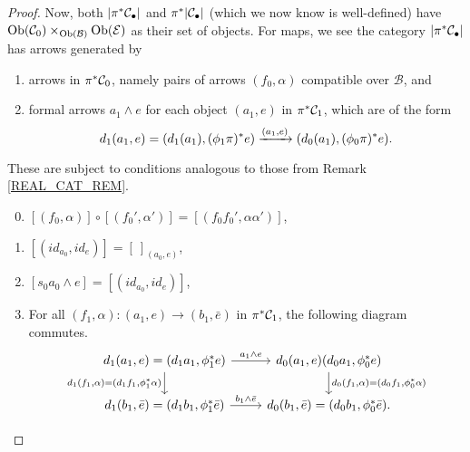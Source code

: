 \documentclass[a4paper,10pt
,draft
]{article}%
\renewcommand{\1}{\eta}%
\begin{document}
\begin{proof}
      Now, both $|\pi^{\**} \mathcal C_\bullet|$ and $\pi^{\**}|\mathcal C_\bullet|$ (which we now know is well-defined)
      have $\mathrm{Ob}(\mathcal C_0) \times_{\mathrm{Ob}(\mathcal B)} \mathrm{Ob}(\mathcal E)$ as their set of objects.
      For maps, we see the category $|\pi^{\**} \mathcal C_\bullet|$ has arrows generated by
      \begin{enumerate}[label = (\Roman*)]
      \item arrows in $\pi^{\**} \mathcal C_0$, namely pairs of arrows $(f_0,\alpha)$ compatible over $\mathcal B$, and
      \item formal arrows $a_1 \wedge e$ for each object $(a_1,e)$ in $\pi^{\**}\mathcal C_1$, which are of the form
            \begin{equation}
                  d_1(a_1,e) = (d_1(a_1), (\phi_1\pi)^{\**}e) \xrightarrow{(a_1,e)} (d_0(a_1), (\phi_0 \pi)^{\**} e).
            \end{equation}
      \end{enumerate}
      These are subject to conditions analogous to those from Remark \ref{REAL_CAT_REM}.
      {\color{OliveGreen}
        \begin{enumerate}[label = (\roman*)]\setcounter{enumi}{-1}
        \item $[(f_0, \alpha)] \circ [(f_0', \alpha')] = [(f_0 f_0', \alpha \alpha')]$,
        \item $[(id_{a_0}, id_e)] = [\ ]_{(a_0,e)}$,
        \item $[s_0 a_0 \wedge e] = [(id_{a_0}, id_e)]$,
        \item For all $(f_1, \alpha): (a_1, e) \to (b_1, \bar e)$ in $\pi^{\**} \mathcal C_1$,
              the following diagram commutes.
              \begin{equation}
                    \begin{tikzcd}
                          d_1(a_1, e) = (d_1 a_1, \phi_1^{\**} e) \arrow[d, "{d_1(f_1, \alpha) = (d_1 f_1, \phi_1^{\**} \alpha)}"'] \arrow[r, "a_1 \wedge e"]
                          &
                          d_0(a_1,e)  (d_0 a_1, \phi_0^{\**} e) \arrow[d, "{d_0(f_1, \alpha) = (d_0 f_1, \phi_0^{\**} \alpha)}"]
                          \\
                          d_1(b_1, \bar e) = (d_1 b_1, \phi_1^{\**} \bar e) \arrow[r, "b_1 \wedge \bar e"]
                          &
                          d_0(b_1, \bar e) = (d_0 b_1, \phi_0^{\**} \bar e).
                    \end{tikzcd}
              \end{equation}

\end{enumerate}}
\end{proof}
\end{document}
